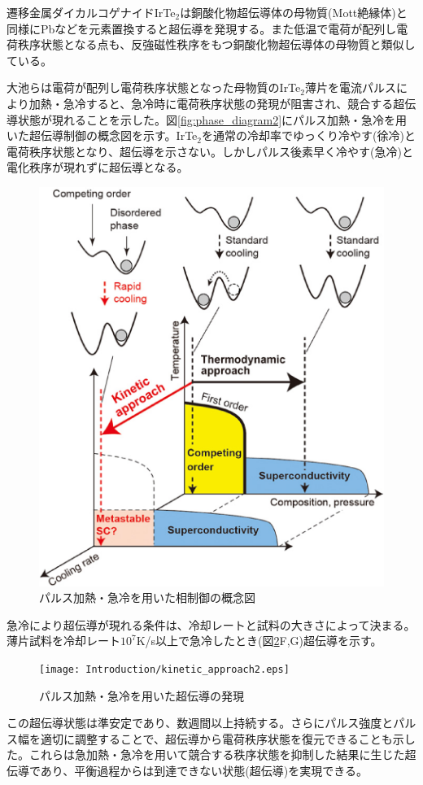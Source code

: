 遷移金属ダイカルコゲナイドIrTe$_2$は銅酸化物超伝導体の母物質(Mott絶縁体)と同様にPbなどを元素置換すると超伝導を発現する\cite{IrTe2Pd_SC}。また低温で電荷が配列し電荷秩序状態となる点も、反強磁性秩序をもつ銅酸化物超伝導体の母物質と類似している。

大池らは電荷が配列し電荷秩序状態となった母物質のIrTe$_2$薄片を電流パルスにより加熱・急冷すると、急冷時に電荷秩序状態の発現が阻害され、競合する超伝導状態が現れることを示した\cite{oike}。図\ref{fig:phase_diagram2}にパルス加熱・急冷を用いた超伝導制御の概念図を示す。IrTe$_2$を通常の冷却率でゆっくり冷やす(徐冷)と電荷秩序状態となり、超伝導を示さない。しかしパルス後素早く冷やす(急冷)と電化秩序が現れずに超伝導となる。
\begin{figure}[!h]
    \begin{center}
   \includegraphics[width=0.6\hsize]{Introduction/kinetic_approach.eps}
  \end{center}
  \caption{パルス加熱・急冷を用いた相制御の概念図}
  \label{fig:kinetic_approach}
\end{figure}

急冷により超伝導が現れる条件は、冷却レートと試料の大きさによって決まる\cite{oike,Oike_size}。薄片試料を冷却レート$10^7$K/s以上で急冷したとき(図\ref{fig:kinetic_approach2}F,G)超伝導を示す。
\begin{figure}[!h]
    \begin{center}
   \texttt{[image: Introduction/kinetic\_approach2.eps]}
  \end{center}
  \caption{パルス加熱・急冷を用いた超伝導の発現}
  \label{fig:kinetic_approach2}
\end{figure}

この超伝導状態は準安定であり、数週間以上持続する。さらにパルス強度とパルス幅を適切に調整することで、超伝導から電荷秩序状態を復元できることも示した。これらは急加熱・急冷を用いて競合する秩序状態を抑制した結果に生じた超伝導であり、平衡過程からは到達できない状態(超伝導)を実現できる。

